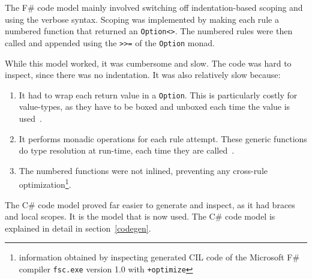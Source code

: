 The F\# code model mainly involved switching off indentation-based scoping and using the verbose syntax.
Scoping was implemented by making each rule a numbered function that returned an \verb|Option<>|.
The numbered rules were then called and appended using the \verb|>>=| of the \verb|Option| monad.

While this model worked, it was cumbersome and slow.
The code was hard to inspect, since there was no indentation.
It was also relatively slow because:

\begin{enumerate}
\item It had to wrap each return value in a \verb|Option|. 
    This is particularly costly for value-types, as they have to be boxed and unboxed each time the value is used~\cite{cisternino}.
\item It performs monadic operations for each rule attempt.
    These generic functions do type resolution at run-time, each time they are called~\cite{cisternino}.
\pagebreak
\item The numbered functions were not inlined, preventing any cross-rule optimization\footnote{information obtained by inspecting generated CIL code of the Microsoft F\# compiler \texttt{fsc.exe} version 1.0 with \texttt{+optimize}}.
\end{enumerate}

The C\# code model proved far easier to generate and inspect, as it had braces and local scopes.
It is the model that is now used. The C\# code model is explained in detail in section~\ref{codegen}.
